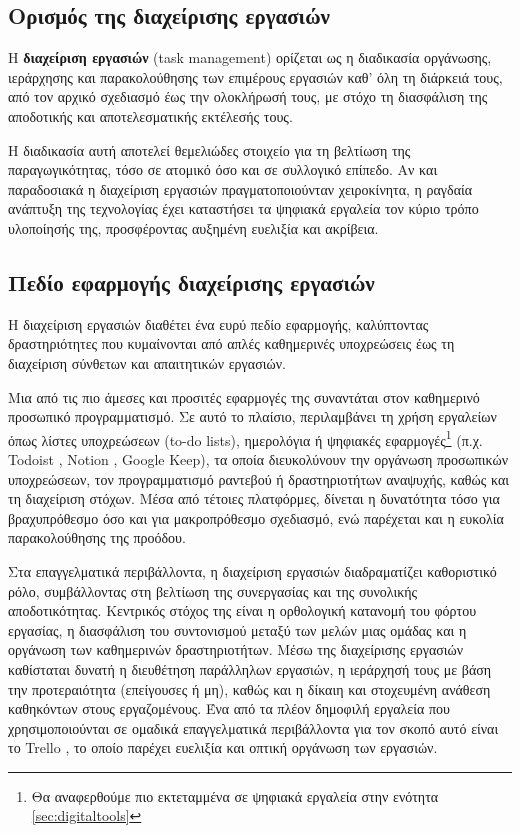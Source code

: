         \subsection{Ορισμός της διαχείρισης εργασιών}
            Η \textbf{διαχείριση εργασιών} (task management) ορίζεται ως η διαδικασία οργάνωσης, ιεράρχησης και παρακολούθησης των επιμέρους εργασιών καθ’ όλη τη διάρκειά τους, από τον αρχικό σχεδιασμό έως την ολοκλήρωσή τους, με στόχο τη διασφάλιση της αποδοτικής και αποτελεσματικής εκτέλεσής τους. \cite{PMBOK}

            Η διαδικασία αυτή αποτελεί θεμελιώδες στοιχείο για τη βελτίωση της παραγωγικότητας, τόσο σε ατομικό όσο και σε συλλογικό επίπεδο. Αν και παραδοσιακά η διαχείριση εργασιών πραγματοποιούνταν χειροκίνητα, η ραγδαία ανάπτυξη της τεχνολογίας έχει καταστήσει τα ψηφιακά εργαλεία τον κύριο τρόπο υλοποίησής της, προσφέροντας αυξημένη ευελιξία και ακρίβεια.

        \subsection{Πεδίο εφαρμογής διαχείρισης εργασιών}
            Η διαχείριση εργασιών διαθέτει ένα ευρύ πεδίο εφαρμογής, καλύπτοντας δραστηριότητες που κυμαίνονται από απλές καθημερινές υποχρεώσεις έως τη διαχείριση σύνθετων και απαιτητικών εργασιών.

            Μια από τις πιο άμεσες και προσιτές εφαρμογές της συναντάται στον καθημερινό προσωπικό προγραμματισμό. Σε αυτό το πλαίσιο, περιλαμβάνει τη χρήση εργαλείων όπως λίστες υποχρεώσεων (to-do lists), ημερολόγια ή ψηφιακές εφαρμογές\footnote{Θα αναφερθούμε πιο εκτεταμμένα σε ψηφιακά εργαλεία στην ενότητα \ref{sec:digitaltools}} (π.χ. Todoist \cite{Todoist}, Notion \cite{Notion}, Google Keep), τα οποία διευκολύνουν την οργάνωση προσωπικών υποχρεώσεων, τον προγραμματισμό ραντεβού ή δραστηριοτήτων αναψυχής, καθώς και τη διαχείριση στόχων. Μέσα από τέτοιες πλατφόρμες, δίνεται η δυνατότητα τόσο για βραχυπρόθεσμο όσο και για μακροπρόθεσμο σχεδιασμό, ενώ παρέχεται και η ευκολία παρακολούθησης της προόδου.

            Στα επαγγελματικά περιβάλλοντα, η διαχείριση εργασιών διαδραματίζει καθοριστικό ρόλο, συμβάλλοντας στη βελτίωση της συνεργασίας και της συνολικής αποδοτικότητας. Κεντρικός στόχος της είναι η ορθολογική κατανομή του φόρτου εργασίας, η διασφάλιση του συντονισμού μεταξύ των μελών μιας ομάδας και η οργάνωση των καθημερινών δραστηριοτήτων.  Μέσω της διαχείρισης εργασιών καθίσταται δυνατή η διευθέτηση παράλληλων εργασιών, η ιεράρχησή τους με βάση την προτεραιότητα (επείγουσες ή μη), καθώς και η δίκαιη και στοχευμένη ανάθεση καθηκόντων στους εργαζομένους. Ένα από τα πλέον δημοφιλή εργαλεία που χρησιμοποιούνται σε ομαδικά επαγγελματικά περιβάλλοντα για τον σκοπό αυτό είναι το Trello \cite{Trello}, το οποίο παρέχει ευελιξία και οπτική οργάνωση των εργασιών.

